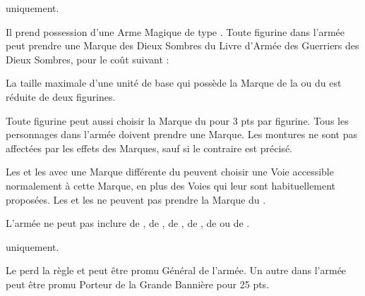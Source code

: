 \begin{multicols}{2}
\startpricelistNSP

\greatkhan{} uniquement.

Il prend possession d'une Arme Magique de type \ironfist{}. Toute figurine dans l'armée peut prendre une Marque des Dieux Sombres du Livre d'Armée des Guerriers des Dieux Sombres, pour le coût suivant :

 La taille maximale d'une unité de base qui possède la Marque de la \pestilence{} ou du \wrath{} est réduite de deux figurines.

Toute figurine peut aussi choisir la Marque du \truechaos{} pour 3 pts par figurine. Tous les personnages dans l'armée doivent prendre une Marque. Les montures ne sont pas affectées par les effets des Marques, sauf si le contraire est précisé.

Les \shamans{} et les \greatshamans{} avec une Marque différente du \truechaos{} peuvent choisir une Voie accessible normalement à cette Marque, en plus des Voies qui leur sont habituellement proposées. Les \shamans{} et les \greatshamans{} ne peuvent pas prendre la Marque du \wrath{}.

L'armée ne peut pas inclure de \mammothhunter{}, de \scrapling{}, de \scraplingtrapper{}, de \yeti{}, de \sabretoothtiger{} ou de \scratapult{}.

\vspace*{\fill}\columnbreak
{}\mammothhunter{} uniquement.

Le \mammothhunter{} perd la règle \notaleader{} et peut être promu Général de l'armée. Un autre \mammothhunter{} dans l'armée peut être promu Porteur de la Grande Bannière pour 25 pts.


\end{multicols}
